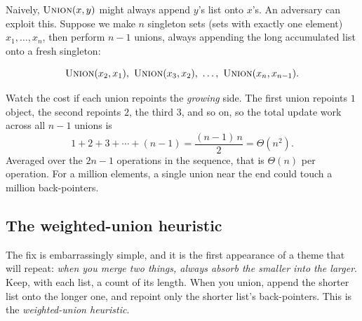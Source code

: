 Naively, $\textsc{Union}(x,y)$ might always append $y$'s list onto $x$'s. An
adversary can exploit this. Suppose we make $n$ singleton sets (sets with exactly one element)
$x_1, \dots, x_n$, then perform $n-1$ unions, always appending the long
accumulated list onto a fresh singleton:

\[
\textsc{Union}(x_2, x_1),\ \textsc{Union}(x_3, x_2),\ \dots,\
\textsc{Union}(x_n, x_{n-1}).
\]

\begin{center}
\end{center}

Watch the cost if each union repoints the \emph{growing} side. The first union
repoints $1$ object, the second repoints $2$, the third $3$, and so on, so the
total update work across all $n-1$ unions is
\[
1 + 2 + 3 + \cdots + (n-1) = \frac{(n-1)\,n}{2} = \Theta(n^2).
\]
Averaged over the $2n-1$ operations in the sequence, that is $\Theta(n)$ per
operation. For a million elements, a single union near the end could touch a
million back-pointers.

\subsection{The weighted-union heuristic}
\label{ch19:weighted}

The fix is embarrassingly simple, and it is the first appearance of a theme
that will repeat: \emph{when you merge two things, always absorb the smaller
into the larger}. Keep, with each list, a count of its length. When you union,
append the shorter list onto the longer one, and repoint only the shorter
list's back-pointers. This is the \emph{weighted-union heuristic}.

